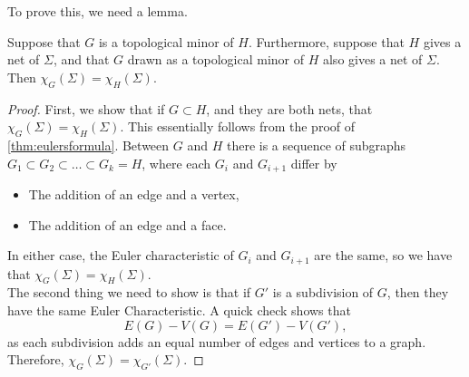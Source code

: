 To prove this, we need a lemma.
\begin{lemma}
Suppose that $G$ is a topological minor of $H$. Furthermore, suppose that $H$ gives a net of $\Sigma$, and that $G$ drawn as a topological minor of $H$ also gives a net of $\Sigma$. Then $\chi_G(\Sigma)=\chi_H(\Sigma)$. 
\end{lemma}
\begin{proof}
First, we show that if $G\subset H$, and they are both nets, that  $\chi_G(\Sigma)=\chi_H(\Sigma)$. This essentially follows from the proof of \ref{thm:eulersformula}. Between $G$ and $H$ there is a sequence of subgraphs $G_1\subset G_2\subset \ldots\subset  G_k=H$, where each $G_i$ and $G_{i+1}$ differ by
\begin{itemize}
\item The addition of an edge and a vertex, 
\item The addition of an edge and a face. 
\end{itemize}
In either case, the Euler characteristic of $G_i$ and $G_{i+1}$ are the same, so we have that $\chi_G(\Sigma)=\chi_H(\Sigma)$.\\
The second thing we need to show is that if $G'$ is a subdivision of $G$, then they have the same Euler Characteristic. A quick check shows that 
\[E(G)-V(G)=E(G')-V(G'),\]
as each subdivision adds an equal number of edges and vertices to a graph. Therefore, $\chi_G(\Sigma)=\chi_{G'}(\Sigma)$. 
\end{proof}
